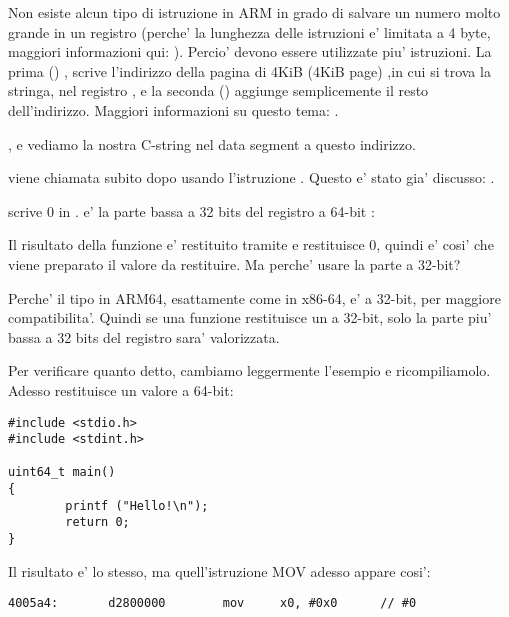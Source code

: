 Non esiste alcun tipo di istruzione in ARM in grado di salvare un numero molto grande in un registro (perche' la lunghezza delle
istruzioni e' limitata a 4 byte, maggiori informazioni qui: ).
Percio' devono essere utilizzate piu' istruzioni. La prima () , scrive l'indirizzo della pagina di 4KiB (4KiB page)
,in cui si trova la stringa, nel registro , e la seconda (\ADD) aggiunge semplicemente il resto dell'indirizzo.
Maggiori informazioni su questo tema: .

, e vediamo la nostra C-string  nel  data segment a questo indirizzo.


\puts viene chiamata subito dopo usando l'istruzione . Questo e' stato gia' discusso: .

\MOV scrive 0 in . 
 e' la parte bassa a 32 bits del registro a 64-bit :



Il risultato della funzione e' restituito tramite  e \main restituisce 0, quindi e' cosi' che viene preparato 
il valore da restituire.
Ma perche' usare la parte a 32-bit?

Perche' il tipo \Tint in ARM64, esattamente come in x86-64, e' a 32-bit, per maggiore compatibilita'.
Quindi se una funzione restituisce un \Tint a 32-bit, solo la parte piu' bassa a 32 bits del registro  sara' valorizzata.

Per verificare quanto detto, cambiamo leggermente l'esempio e ricompiliamolo.
Adesso \main restituisce un valore a 64-bit:

\begin{lstlisting}[caption=\main returning a value of \TT{uint64\_t} type,style=customc]
#include <stdio.h>
#include <stdint.h>

uint64_t main()
{
        printf ("Hello!\n");
        return 0;
}
\end{lstlisting}

Il risultato e' lo stesso, ma quell'istruzione MOV adesso appare cosi': 

\begin{lstlisting}[caption=\NonOptimizing GCC 4.8.1 + objdump]
  4005a4:       d2800000        mov     x0, #0x0      // #0
\end{lstlisting}


